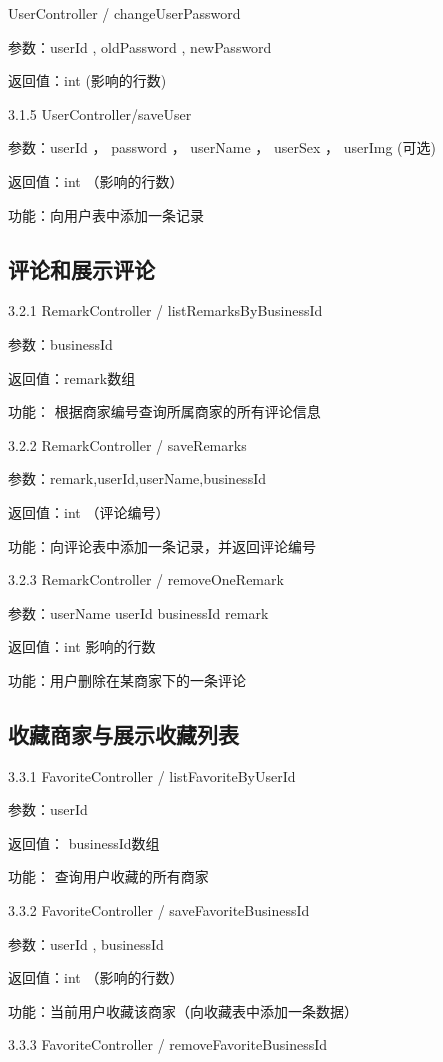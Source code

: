     UserController / changeUserPassword

    参数：userId , oldPassword , newPassword

    返回值：int (影响的行数)

    3.1.5 UserController/saveUser

    参数：userId ， password ， userName ， userSex ， userImg (可选)

    返回值：int （影响的行数）

    功能：向用户表中添加一条记录
    \subsection{评论和展示评论}

    3.2.1 RemarkController / listRemarksByBusinessId

    参数：businessId

    返回值：remark数组

    功能： 根据商家编号查询所属商家的所有评论信息

    3.2.2 RemarkController / saveRemarks

    参数：remark,userId,userName,businessId

    返回值：int （评论编号）

    功能：向评论表中添加一条记录，并返回评论编号

    3.2.3 RemarkController / removeOneRemark

    参数：userName userId businessId remark

    返回值：int 影响的行数

    功能：用户删除在某商家下的一条评论
    \subsection{收藏商家与展示收藏列表}

    3.3.1 FavoriteController / listFavoriteByUserId

    参数：userId

    返回值： businessId数组

    功能： 查询用户收藏的所有商家

    3.3.2 FavoriteController / saveFavoriteBusinessId

    参数：userId , businessId

    返回值：int （影响的行数）

    功能：当前用户收藏该商家（向收藏表中添加一条数据）

    3.3.3 FavoriteController / removeFavoriteBusinessId


